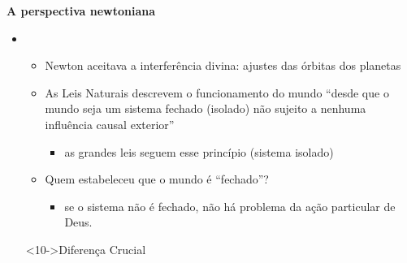 \begin{frame}{\textbf{A perspectiva newtoniana}}
  \begin{itemize}
    \item<2->[$\bullet$]  
     \begin{itemize}
      \item<5-> Newton aceitava a interferência divina: ajustes das órbitas dos 
       planetas
      \item<6-> As Leis Naturais descrevem o funcionamento do mundo 
       ``desde que o mundo seja um \textcolor{NordRed}{sistema fechado} (isolado) 
       não sujeito a nenhuma influência causal exterior''
       \begin{itemize}
        \item<7->[-] as grandes leis seguem esse princípio (sistema isolado) 
       \end{itemize}
      \item<8-> Quem estabeleceu que o mundo é ``fechado''?
       \begin{itemize}
        \item<9->[-] se o sistema \textcolor{NordOrange}{não} é fechado, não há 
        problema da \textcolor{NordOrange}{ação particular} de Deus.
       \end{itemize}
     \end{itemize}
     \centering
      \begin{minipage}{\textwidth}
      \begin{block}<10->{Diferença Crucial}
       \centering
       \\
       \\ 
      \end{block}
     \end{minipage}
  \end{itemize}
	
\end{frame}

